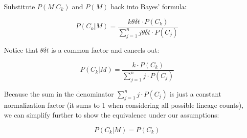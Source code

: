 \documentclass{article}
\begin{document}
Substitute \( P(M | C_k) \) and \( P(M) \) back into Bayes' formula:

\[ P(C_k | M) = \frac{k \theta \delta t \cdot P(C_k)}{\sum_{j=1}^{n} j \theta \delta t \cdot P(C_j)} \]

Notice that \( \theta \delta t \) is a common factor and cancels out:

\[ P(C_k | M) = \frac{k \cdot P(C_k)}{\sum_{j=1}^{n} j \cdot P(C_j)} \]

Because the sum in the denominator \( \sum_{j=1}^{n} j \cdot P(C_j) \) is just a constant normalization factor (it sums to 1 when considering all possible lineage counts), we can simplify further to show the equivalence under our assumptions:

\[ P(C_k | M) = P(C_k) \]
\end{document}
